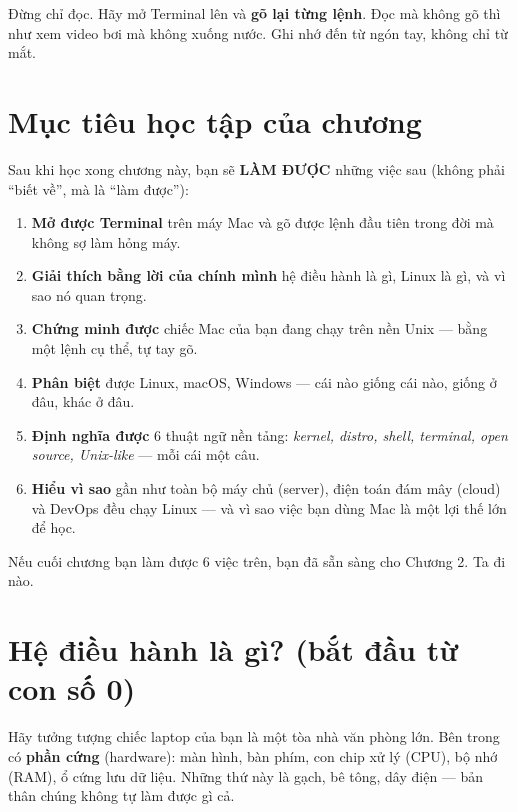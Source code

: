 \documentclass[12pt,a4paper]{article}
\begin{document}
\begin{tipbox}
Đừng chỉ đọc. Hãy mở Terminal lên và \textbf{gõ lại từng lệnh}. Đọc mà không gõ thì như xem video bơi mà không xuống nước. Ghi nhớ đến từ ngón tay, không chỉ từ mắt.
\end{tipbox}

\section{Mục tiêu học tập của chương}

Sau khi học xong chương này, bạn sẽ \textbf{LÀM ĐƯỢC} những việc sau (không phải ``biết về'', mà là ``làm được''):

\begin{enumerate}[leftmargin=*]
  \item \textbf{Mở được Terminal} trên máy Mac và gõ được lệnh đầu tiên trong đời mà không sợ làm hỏng máy.
  \item \textbf{Giải thích bằng lời của chính mình} hệ điều hành là gì, Linux là gì, và vì sao nó quan trọng.
  \item \textbf{Chứng minh được} chiếc Mac của bạn đang chạy trên nền Unix — bằng một lệnh cụ thể, tự tay gõ.
  \item \textbf{Phân biệt} được Linux, macOS, Windows — cái nào giống cái nào, giống ở đâu, khác ở đâu.
  \item \textbf{Định nghĩa được} 6 thuật ngữ nền tảng: \textit{kernel, distro, shell, terminal, open source, Unix-like} — mỗi cái một câu.
  \item \textbf{Hiểu vì sao} gần như toàn bộ máy chủ (server), điện toán đám mây (cloud) và DevOps đều chạy Linux — và vì sao việc bạn dùng Mac là một lợi thế lớn để học.
\end{enumerate}

Nếu cuối chương bạn làm được 6 việc trên, bạn đã sẵn sàng cho Chương 2. Ta đi nào.

\section{Hệ điều hành là gì? (bắt đầu từ con số 0)}

Hãy tưởng tượng chiếc laptop của bạn là một tòa nhà văn phòng lớn. Bên trong có \textbf{phần cứng} (hardware): màn hình, bàn phím, con chip xử lý (CPU), bộ nhớ (RAM), ổ cứng lưu dữ liệu. Những thứ này là gạch, bê tông, dây điện — bản thân chúng không tự làm được gì cả.
\end{document}
